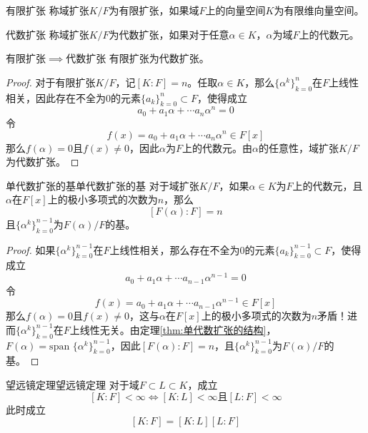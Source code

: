 \documentclass[lang = cn, scheme = chinese, thmcnt = section]{elegantbook}
\newcommand{\sub}{\subset}             %
\begin{document}
\begin{definition}{有限扩张}
	称域扩张$K/F$为有限扩张，如果域$F$上的向量空间$K$为有限维向量空间。
\end{definition}

\begin{definition}{代数扩张}
	称域扩张$K/F$为代数扩张，如果对于任意$\alpha\in K$，$\alpha$为域$F$上的代数元。
\end{definition}

\begin{theorem}{有限扩张$\implies$代数扩张}
	有限扩张为代数扩张。
\end{theorem}

\begin{proof}
	对于有限扩张$K/F$，记$[K:F]=n$。任取$\alpha\in K$，那么$\{\alpha^k\}_{k=0}^{n}$在$F$上线性相关，因此存在不全为$0$的元素$\{a_k\}_{k=0}^{n}\sub F$，使得成立
	$$
	a_0+a_1\alpha+\cdots a_n\alpha^n=0
	$$
	令
	$$
	f(x)=a_0+a_1\alpha+\cdots a_n\alpha^n\in F[x]
	$$
	那么$f(\alpha)=0$且$f(x)\ne 0$，因此$\alpha$为$F$上的代数元。由$\alpha$的任意性，域扩张$K/F$为代数扩张。
\end{proof}

\begin{theorem}{单代数扩张的基}{单代数扩张的基}
	对于域扩张$K/F$，如果$\alpha\in K$为$F$上的代数元，且$\alpha$在$F[x]$上的极小多项式的次数为$n$，那么
	$$
	[F(\alpha):F]=n
	$$
	且$\{\alpha^k\}_{k=0}^{n-1}$为$F(\alpha)/F$的基。
\end{theorem}

\begin{proof}
	如果$\{\alpha^k\}_{k=0}^{n-1}$在$F$上线性相关，那么存在不全为$0$的元素$\{a_k\}_{k=0}^{n-1}\sub F$，使得成立
	$$
	a_0+a_1\alpha+\cdots a_{n-1}\alpha^{n-1}=0
	$$
	令
	$$
	f(x)=a_0+a_1\alpha+\cdots  a_{n-1}\alpha^{n-1}\in F[x]
	$$那么$f(\alpha)=0$且$f(x)\ne 0$，这与$\alpha$在$F[x]$上的极小多项式的次数为$n$矛盾！进而$\{\alpha^k\}_{k=0}^{n-1}$在$F$上线性无关。由定理\ref{thm:单代数扩张的结构}，$F(\alpha)=\text{span }\{\alpha^k\}_{k=0}^{n-1}$，因此$[F(\alpha):F]=n$，且$\{\alpha^k\}_{k=0}^{n-1}$为$F(\alpha)/F$的基。
\end{proof}

\begin{theorem}{望远镜定理}{望远镜定理}
	对于域$F\sub L\sub K$，成立
	$$
	[K:F]<\infty\iff [K:L]<\infty\text{且}[L:F]<\infty
	$$
	此时成立
	$$
	[K:F]=[K:L][L:F]
	$$
\end{theorem}
\end{document}
